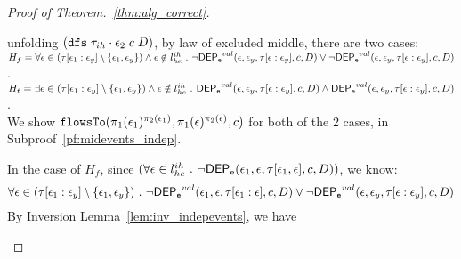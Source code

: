\begin{proof}[Proof of Theorem.~\ref{thm:alg_correct}]
\begin{case}
\begin{subcase}
\begin{subsubcase}
%
unfolding $ (\mathtt{dfs} \; {\mathtt{\tau}_{ih} \cdot \mathtt{\epsilon}_2} \; c \; D)$, by law of excluded middle,   there are two cases:
\\
$H_f =  \forall \mathtt{\epsilon} \in (\mathtt{\tau}[\mathtt{\epsilon}_1:\mathtt{\epsilon}_y]\setminus \{\mathtt{\epsilon}_1, \mathtt{\epsilon}_y\}) 
 \land \mathtt{\epsilon} \notin l^{ih}_{he} ~.~
\neg \mathsf{DEP_{\mathtt{e}}}^{val} (\mathtt{\epsilon}, \mathtt{\epsilon}_y, \mathtt{\tau}[\mathtt{\epsilon}:\mathtt{\epsilon}_y], c, D) \lor \neg \mathsf{DEP_{\mathtt{e}}}^{val} (\mathtt{\epsilon}, \mathtt{\epsilon}_y, \mathtt{\tau}[\mathtt{\epsilon}:\mathtt{\epsilon}_y], c, D)$.
\\
$H_t = \exists \mathtt{\epsilon} \in (\mathtt{\tau}[\mathtt{\epsilon}_1:\mathtt{\epsilon}_y]\setminus \{\mathtt{\epsilon}_1, \mathtt{\epsilon}_y\}) 
\land \mathtt{\epsilon} \notin l^{ih}_{he} ~.~
\mathsf{DEP_{\mathtt{e}}}^{val} (\mathtt{\epsilon}, \mathtt{\epsilon}_y, \mathtt{\tau}[\mathtt{\epsilon}:\mathtt{\epsilon}_y], c, D) \land \mathsf{DEP_{\mathtt{e}}}^{val} (\mathtt{\epsilon}, \mathtt{\epsilon}_y, \mathtt{\tau}[\mathtt{\epsilon}:\mathtt{\epsilon}_y], c, D)$.
\\
We show $\mathtt{flowsTo}(\pi_1(\mathtt{\epsilon}_1)^{\pi_2(\mathtt{\epsilon}_1)}, \pi_1(\mathtt{\epsilon})^{\pi_2(\mathtt{\epsilon})}, c)$ for both of the 2 cases,
 in Subproof~\ref{pf:midevents_indep}.
%
\begin{subproof}
  \label{pf:midevents_indep}
  In the case of $H_f$, since $(\forall \mathtt{\epsilon} \in l^{ih}_{he} ~.~ \neg \mathsf{DEP_{\mathtt{e}}}(\mathtt{\epsilon}_1, \mathtt{\epsilon}, \mathtt{\tau}[\mathtt{\epsilon}_1, \mathtt{\epsilon}], c, D))$,
  we know:
  \[
      \forall \mathtt{\epsilon} \in (\mathtt{\tau}[\mathtt{\epsilon}_1:\mathtt{\epsilon}_y]\setminus \{\mathtt{\epsilon}_1, \mathtt{\epsilon}_y\}) ~.~
      \neg \mathsf{DEP_{\mathtt{e}}}^{val} (\mathtt{\epsilon}_1, \mathtt{\epsilon}, \mathtt{\tau}[\mathtt{\epsilon}_1: \mathtt{\epsilon}], c, D) 
      \lor \neg \mathsf{DEP_{\mathtt{e}}}^{val} (\mathtt{\epsilon}, \mathtt{\epsilon}_y,\mathtt{\tau}[\mathtt{\epsilon}:\mathtt{\epsilon}_y], c, D)
    \]
    By Inversion Lemma~\ref{lem:inv_indepevents}, we have

\end{subproof}
\end{subsubcase}
\end{subcase}
\end{case}
\end{proof}
